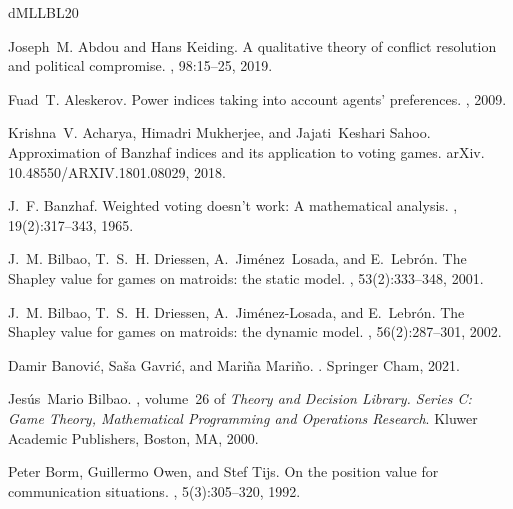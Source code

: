 \documentclass[11pt]{amsart}
\theoremstyle{plain}
\theoremstyle{definition}
\theoremstyle{remark}
\begin{document}

%



%

%


\begin{thebibliography}{dMLLBL20}

Joseph~M. Abdou and Hans Keiding.
\newblock A qualitative theory of conflict resolution and political compromise.
, 98:15--25, 2019.

Fuad~T. Aleskerov.
\newblock Power indices taking into account agents' preferences.
, 2009.

Krishna~V. Acharya, Himadri Mukherjee, and Jajati~Keshari Sahoo.
\newblock Approximation of {B}anzhaf indices and its application to voting
  games.
\newblock arXiv. 10.48550/ARXIV.1801.08029, 2018.

J.~F. Banzhaf.
\newblock Weighted voting doesn't work: {A} mathematical analysis.
, 19(2):317--343, 1965.

J.~M. Bilbao, T.~S.~H. Driessen, A.~Jim\'{e}nez~Losada, and E.~Lebr\'{o}n.
\newblock The {S}hapley value for games on matroids: the static model.
, 53(2):333--348, 2001.

J.~M. Bilbao, T.~S.~H. Driessen, A.~Jim\'{e}nez-Losada, and E.~Lebr\'{o}n.
\newblock The {S}hapley value for games on matroids: the dynamic model.
, 56(2):287--301, 2002.

Damir Banović, Saša Gavrić, and Mariña Mariño.
.
\newblock Springer Cham, 2021.

Jes\'{u}s~Mario Bilbao.
, volume~26 of
  {\em Theory and Decision Library. Series C: Game Theory, Mathematical
  Programming and Operations Research}.
\newblock Kluwer Academic Publishers, Boston, MA, 2000.

Peter Borm, Guillermo Owen, and Stef Tijs.
\newblock On the position value for communication situations.
, 5(3):305--320, 1992.


\end{thebibliography}
\end{document}

